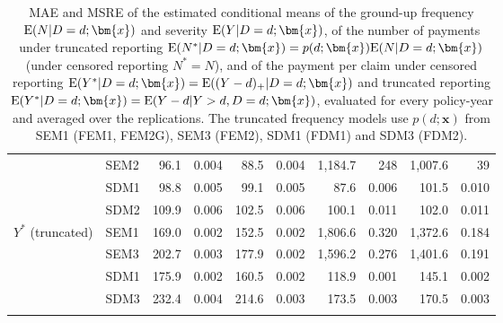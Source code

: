 \begin{table}[!ht]
{{\begin{tabular}{llrrrrrrrr}
 & SEM2 & 96.1 & 0.004 & 88.5 & 0.004 & 1,184.7 & 248 & 1,007.6 & 39 \\
 & SDM1 & 98.8 & 0.005 & 99.1 & 0.005 & 87.6 & 0.006 & 101.5 & 0.010 \\
 & SDM2 & 109.9 & 0.006 & 102.5 & 0.006 & 100.1 & 0.011 & 102.0 & 0.011 \\
\midrule
\multirow{4}{*}{$Y^*$ (truncated)} & SEM1 & 169.0 & 0.002 & 152.5 & 0.002 & 1,806.6 & 0.320 & 1,372.6 & 0.184 \\
 & SEM3 & 202.7 & 0.003 & 177.9 & 0.002 & 1,596.2 & 0.276 & 1,401.6 & 0.191 \\
 & SDM1 & 175.9 & 0.002 & 160.5 & 0.002 & 118.9 & 0.001 & 145.1 & 0.002 \\
 & SDM3 & 232.4 & 0.004 & 214.6 & 0.003 & 173.5 & 0.003 & 170.5 & 0.003 \\
\hhline{==========}
\end{tabular}
}
}
\caption{MAE and MSRE of the estimated conditional means of the ground-up frequency ${\rm E}(N|D=d;\bm{x})$ and severity ${\rm E}(Y|D=d;\bm{x})$, of the number of payments under truncated reporting ${\rm E}(N^*|D=d;\bm{x})=p(d;\bm{x}){\rm E}(N|D=d;\bm{x})$ (under censored reporting $N^*=N$), and of the payment per claim under censored reporting ${\rm E}(Y^*|D=d;\bm{x})={\rm E}((Y-d)_+|D=d;\bm{x})$ and truncated reporting ${\rm E}(Y^*|D=d;\bm{x})={\rm E}(Y-d|Y>d,D=d;\bm{x})$, evaluated for every policy-year and averaged over the replications. The truncated frequency models use $p(d;\bm{x})$ from SEM1 (FEM1, FEM2G), SEM3 (FEM2), SDM1 (FDM1) and SDM3 (FDM2).}\label{tab:AppSimComponents}
\end{table}
